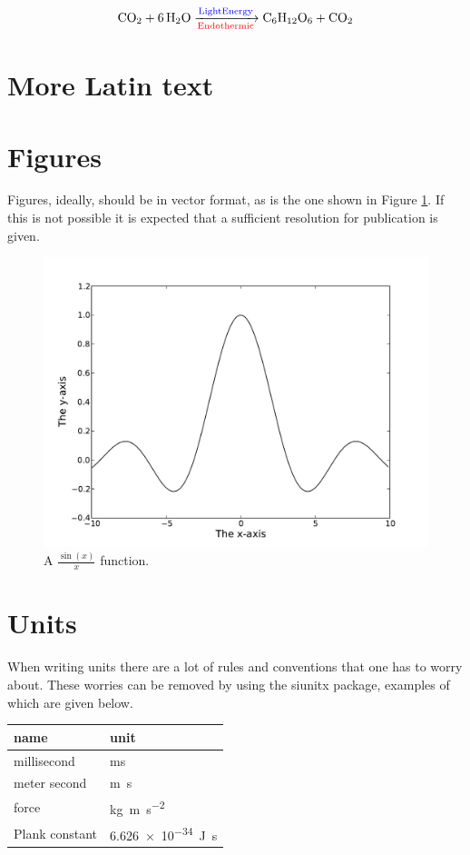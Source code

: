 \begin{equation}
\ce{CO2 + 6H2O ->[\textcolor{blue}{Light Energy}][\textcolor{red}{Endothermic}] C6H12O6 + CO2}
\end{equation}


\section{More Latin text}

\lipsum[1-4]

\section{Figures}

Figures, ideally, should be in vector format, as is the one shown in Figure \ref{fig:vectorFig}. If this is not possible it is expected that a sufficient resolution for publication is given.

\begin{figure}[h!]
\includegraphics[width=0.5 \textwidth]{figs/sinc1.pdf}
\caption{A $\frac{\sin(x)}{x}$ function.}
\label{fig:vectorFig}
\end{figure}

\section{Units}

When writing units there are a lot of rules and conventions that one has to worry about. These worries can be removed by using the siunitx package, examples of which are given below.

\begin{table}[h!]
\centering
\begin{tabular}{ll}
\toprule
name & unit \\ \midrule
millisecond & \si{ms} \\
meter second & \si{m.s} \\
force & \si{kg.m.s^{-2}}\\
Plank constant & \SI{6.626e-34}{J.s}\\
\bottomrule
\end{tabular}
\end{table}


